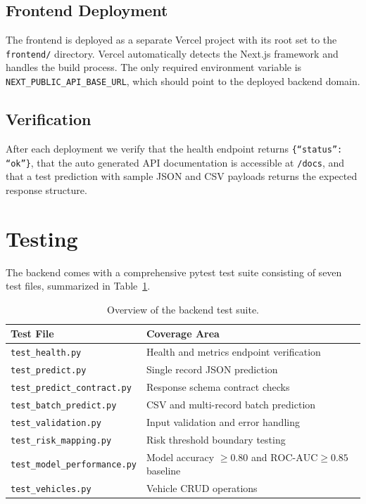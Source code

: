 \documentclass[conference]{IEEEtran}
\begin{document}
\subsection{Frontend Deployment}
The frontend is deployed as a separate Vercel project with its root set to the \texttt{frontend/} directory. Vercel automatically detects the Next.js framework and handles the build process. The only required environment variable is \texttt{NEXT\_PUBLIC\_API\_BASE\_URL}, which should point to the deployed backend domain.

\subsection{Verification}
After each deployment we verify that the health endpoint returns \texttt{\{``status'': ``ok''\}}, that the auto generated API documentation is accessible at \texttt{/docs}, and that a test prediction with sample JSON and CSV payloads returns the expected response structure.

\section{Testing}

The backend comes with a comprehensive pytest test suite consisting of seven test files, summarized in Table~\ref{tab:tests}.

\begin{table}[H]
\centering
\caption{Overview of the backend test suite.}
\label{tab:tests}
\begin{tabular}{ll}
\toprule
Test File & Coverage Area \\
\midrule
\texttt{test\_health.py} & Health and metrics endpoint verification \\
\texttt{test\_predict.py} & Single record JSON prediction \\
\texttt{test\_predict\_contract.py} & Response schema contract checks \\
\texttt{test\_batch\_predict.py} & CSV and multi-record batch prediction \\
\texttt{test\_validation.py} & Input validation and error handling \\
\texttt{test\_risk\_mapping.py} & Risk threshold boundary testing \\
\texttt{test\_model\_performance.py} & Model accuracy $\geq 0.80$ and $\text{ROC-AUC} \geq 0.85$ baseline \\
\texttt{test\_vehicles.py} & Vehicle CRUD operations \\
\bottomrule
\end{tabular}
\end{table}
\end{document}
